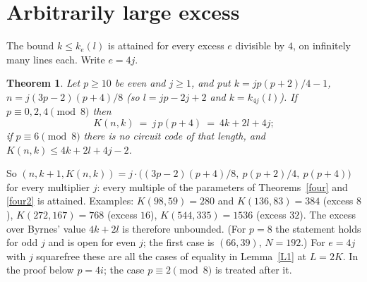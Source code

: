 \documentclass[11pt]{article}
\newtheorem{theorem}{Theorem}
\theoremstyle{remark}
\begin{document}
\section{Arbitrarily large excess}\label{sec:large}
The bound $k\le k_e(l)$ is attained for every excess $e$ divisible by $4$, on infinitely many lines each. Write $e=4j$.

\begin{theorem}\label{large}
Let $p\ge 10$ be even and $j\ge 1$, and put $k=jp(p+2)/4-1$, $n=j(3p-2)(p+4)/8$ (so $l=jp-2j+2$ and $k=k_{4j}(l)$).
If $p\equiv 0,2,4\pmod 8$ then
\[ K(n,k)\ =\ j\,p(p+4)\ =\ 4k+2l+4j ; \]
if $p\equiv 6\pmod 8$ there is no circuit code of that length, and $K(n,k)\le 4k+2l+4j-2$.
\end{theorem}
\noindent So $(n,k+1,K(n,k))=j\cdot\bigl((3p-2)(p+4)/8,\ p(p+2)/4,\ p(p+4)\bigr)$ for every multiplier $j$: every multiple of the
parameters of Theorems~\ref{four} and \ref{four2} is attained. Examples: $K(98,59)=280$ and $K(136,83)=384$ (excess $8$),
$K(272,167)=768$ (excess $16$), $K(544,335)=1536$ (excess $32$). The excess over Byrnes' value $4k+2l$ is therefore unbounded.
(For $p=8$ the statement holds for odd $j$ and is open for even $j$; the first case is $(66,39)$, $N=192$.)
For $e=4j$ with $j$ squarefree these are all the cases of equality in Lemma~\ref{L1} at $L=2K$.
In the proof below $p=4i$; the case $p\equiv 2\pmod 8$ is treated after it.
\end{document}
